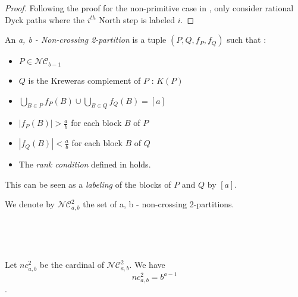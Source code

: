 \begin{proof}
    Following the proof for the non-primitive case in
    \cite{ref8}, only consider rational Dyck paths where the
    $i^{th}$ North step is labeled $i$.
\end{proof}

\begin{definition}
    An \emph{a, b - Non-crossing 2-partition} is
    a tuple $(P, Q, f_P, f_Q)$ such that :
    \begin{itemize}
        \item $P \in \mathcal{NC}_{b-1}$
        \item $Q$ is the Kreweras complement of $P$ : $K(P)$
        \item $\displaystyle \bigcup_{B \in P}{f_P(B)} \cup
                \bigcup_{B \in Q}{f_Q(B)} = [a]$
        \item $|f_P(B)| > \frac{a}{b}$ for each block $B$
                of $P$
        \item $|f_Q(B)| < \frac{a}{b}$ for each block $B$
                of $Q$
        \item The \emph{rank condition} defined in
            \cite{ref8} holds.  
    \end{itemize}
\end{definition}

This can be seen as a \emph{labeling} of the blocks of
$P$ and $Q$ by $[a]$.

We denote by $\mathcal{NC}^2_{a,b}$ the set of 
a, b - non-crossing 2-partitions.

\begin{example}[$a > b : a = 7, b = 3$]
    ~\\
    \begin{center}
                
    \end{center}
\end{example}

\begin{example}[$a < b : a = 3, b = 5$]
    ~\\
    \begin{center}
                
    \end{center}
\end{example}

\begin{theorem}[Bodnar, 2017]
    Let $nc^2_{a,b}$ be the cardinal of $\mathcal{NC}^2_{a,b}$.
    We have $$nc^2_{a,b} = b^{a-1}$$.    
\end{theorem}

